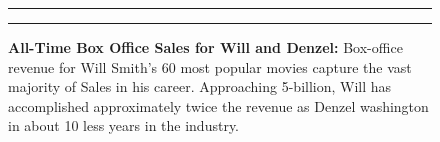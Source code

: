 \documentclass[]{article}
\begin{document}
\begin{figure}[!ht]
 \label{fig:one-graphic}
    \begin{center}
    \end{center}
    \hrule
      \vspace{2mm}
    \caption{ \textbf{All-Time Box Office Sales for Will and Denzel:} \newline \footnotesize{ Box-office revenue
    for Will Smith's 60 most popular movies capture the vast majority of Sales in his career.\newline \newline
    Approaching 5-billion, Will has accomplished approximately twice the revenue as Denzel washington in 
    about 10 less years in the industry. }  }
    \vspace{2mm}
    \hrule
\end{figure}
\end{document}
